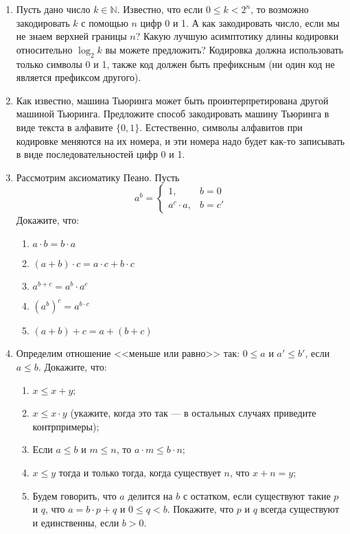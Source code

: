 \documentclass[10pt,a4paper,oneside]{article}
\begin{document}
\begin{enumerate}
\item Пусть дано число $k \in \mathbb{N}$. Известно, что если $0 \le k < 2^n$, то возможно закодировать $k$ с помощью $n$ цифр 0 и 1.
А как закодировать число, если мы не знаем верхней границы $n$? Какую лучшую асимптотику длины кодировки относительно $\log_2 k$ вы можете
предложить? Кодировка должна использовать только символы 0 и 1, также код должен быть префиксным (ни один код не является префиксом другого).

\item Как известно, машина Тьюринга может быть проинтерпретирована другой машиной Тьюринга.
Предложите способ закодировать машину Тьюринга в виде текста в алфавите $\{0,1\}$.
Естественно, символы алфавитов при кодировке меняются на их номера, и эти номера надо будет как-то записывать в виде последовательностей цифр 0 и 1.

\item Рассмотрим аксиоматику Пеано. 
Пусть $$a^b = \left\{\begin{array}{ll}1,& b= 0 \\a^c\cdot a,&b = c'\end{array}\right.$$
Докажите, что:
\begin{enumerate}
\item $a \cdot b = b \cdot a$
\item $(a + b) \cdot c = a \cdot c + b \cdot c$
\item $a^{b+c} = a^b \cdot a^c$
\item $(a^b)^c = a^{b \cdot c}$
\item $(a + b) + c = a + (b + c)$
\end{enumerate}

\item Определим отношение <<меньше или равно>> так: $0 \le a$ и $a' \le b'$, если $a \le b$. Докажите, что:
\begin{enumerate}
\item $x \le x+y$;
\item $x \le x \cdot y$ (укажите, когда это так --- в остальных случаях приведите контрпримеры);
\item Если $a \le b$ и $m \le n$, то $a \cdot m \le b \cdot n$;
\item $x \le y$ тогда и только тогда, когда существует $n$, что $x + n = y$;
\item Будем говорить, что $a$ делится на $b$ с остатком, если существуют такие $p$ и $q$, что 
$a = b \cdot p + q$ и $0 \le q < b$. Покажите, что $p$ и $q$ всегда существуют и единственны,
если $b > 0$.
\end{enumerate}


\end{enumerate}
\end{document}
